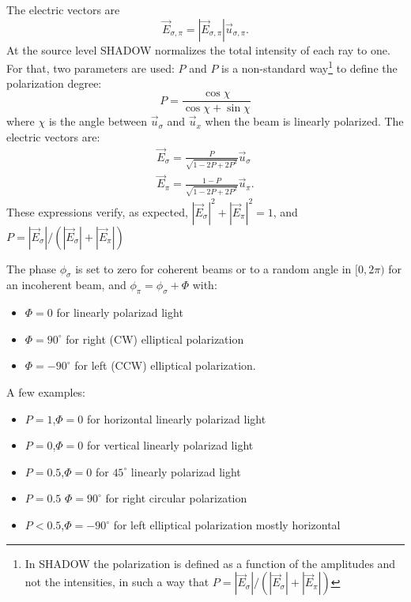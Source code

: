 \documentclass{iucr}
\begin{document}
The electric vectors are 
\begin{equation}
    \vec{E}_{\sigma,\pi} = |\vec{E}_{\sigma,\pi}| \vec{u}_{\sigma,\pi}.
\end{equation}
At the source level SHADOW normalizes the total intensity of each ray to one. For that, two parameters are used: $P$ and %
$P$ is a non-standard way\footnote{In SHADOW the polarization is defined as a function of the amplitudes and not the intensities, in such a way that $P=|\vec{E}_\sigma|/(|\vec{E}_\sigma|+|\vec{E}_\pi|)$} to define the polarization degree:
\begin{equation}
   P = \frac{\cos \chi}{\cos \chi + \sin \chi}
\end{equation}
where $\chi$ is the angle between $\vec{u}_\sigma$ and $\vec{u}_x$ when the beam is linearly polarized. 
The electric vectors are: 
\begin{eqnarray}
   \vec{E}_\sigma = \frac{P}{\sqrt{1-2 P+ 2 P^2}} \vec{u}_\sigma \nonumber \\
   \vec{E}_\pi    = \frac{1-P}{\sqrt{1-2 P+ 2 P^2}} \vec{u}_\pi.
\end{eqnarray}
These expressions verify, as expected,  $|\vec{E}_\sigma|^2 + |\vec{E}_\pi|^2 = 1$, and $P=|\vec{E}_\sigma|/(|\vec{E}_\sigma|+|\vec{E}_\pi|)$

The phase $\phi_\sigma$ is set to zero for coherent beams or to a random angle in $[0,2\pi)$ for an incoherent beam, and
$\phi_\pi=\phi_\sigma+\Phi$ with: 
\begin{itemize}
 \item $\Phi=0$ for linearly polarizad light 
 \item $\Phi=90^{\circ}$ for right (CW) elliptical polarization
 \item $\Phi=-90^{\circ}$ for left (CCW) elliptical polarization.
\end{itemize}
A few examples: 
\begin{itemize}
 \item $P=1$,$\Phi=0$ for horizontal linearly polarizad light 
 \item $P=0$,$\Phi=0$ for vertical linearly polarizad light
 \item $P=0.5$,$\Phi=0$ for $45^\circ$ linearly polarizad light
 \item $P=0.5$ $\Phi=90^{\circ}$ for right circular polarization
 \item $P<0.5$,$\Phi=-90^{\circ}$ for left elliptical polarization mostly horizontal
\end{itemize}
\end{document}
